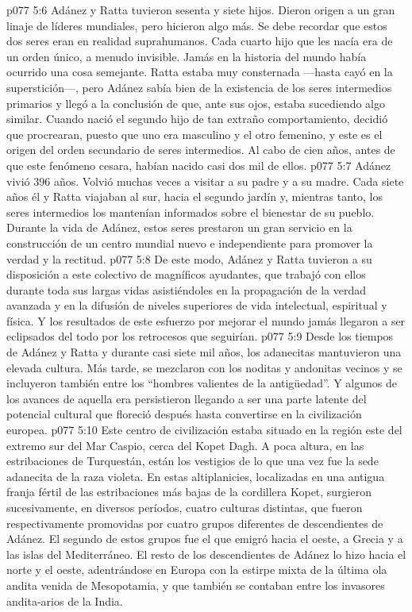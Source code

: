 \vs p077 5:6 \pc Adánez y Ratta tuvieron sesenta y siete hijos. Dieron origen a un gran linaje de líderes mundiales, pero hicieron algo más. Se debe recordar que estos dos seres eran en realidad suprahumanos. Cada cuarto hijo que les nacía era de un orden único, a menudo invisible. Jamás en la historia del mundo había ocurrido una cosa semejante. Ratta estaba muy consternada ---hasta cayó en la superstición---, pero Adánez sabía bien de la existencia de los seres intermedios primarios y llegó a la conclusión de que, ante sus ojos, estaba sucediendo algo similar. Cuando nació el segundo hijo de tan extraño comportamiento, decidió que procrearan, puesto que uno era masculino y el otro femenino, y este es el origen del orden secundario de seres intermedios. Al cabo de cien años, antes de que este fenómeno cesara, habían nacido casi dos mil de ellos.
\vs p077 5:7 \pc Adánez vivió 396 años. Volvió muchas veces a visitar a su padre y a su madre. Cada siete años él y Ratta viajaban al sur, hacia el segundo jardín y, mientras tanto, los seres intermedios los mantenían informados sobre el bienestar de su pueblo. Durante la vida de Adánez, estos seres prestaron un gran servicio en la construcción de un centro mundial nuevo e independiente para promover la verdad y la rectitud.
\vs p077 5:8 De este modo, Adánez y Ratta tuvieron a su disposición a este colectivo de magníficos ayudantes, que trabajó con ellos durante toda sus largas vidas asistiéndoles en la propagación de la verdad avanzada y en la difusión de niveles superiores de vida intelectual, espiritual y física. Y los resultados de este esfuerzo por mejorar el mundo jamás llegaron a ser eclipsados del todo por los retrocesos que seguirían.
\vs p077 5:9 \pc Desde los tiempos de Adánez y Ratta y durante casi siete mil años, los adanecitas mantuvieron una elevada cultura. Más tarde, se mezclaron con los noditas y andonitas vecinos y se incluyeron también entre los “hombres valientes de la antigüedad”. Y algunos de los avances de aquella era persistieron llegando a ser una parte latente del potencial cultural que floreció después hasta convertirse en la civilización europea.
\vs p077 5:10 Este centro de civilización estaba situado en la región este del extremo sur del Mar Caspio, cerca del Kopet Dagh. A poca altura, en las estribaciones de Turquestán, están los vestigios de lo que una vez fue la sede adanecita de la raza violeta. En estas altiplanicies, localizadas en una antigua franja fértil de las estribaciones más bajas de la cordillera Kopet, surgieron sucesivamente, en diversos períodos, cuatro culturas distintas, que fueron respectivamente promovidas por cuatro grupos diferentes de descendientes de Adánez. El segundo de estos grupos fue el que emigró hacia el oeste, a Grecia y a las islas del Mediterráneo. El resto de los descendientes de Adánez lo hizo hacia el norte y el oeste, adentrándose en Europa con la estirpe mixta de la última ola andita venida de Mesopotamia, y que también se contaban entre los invasores andita\hyp{}arios de la India.
